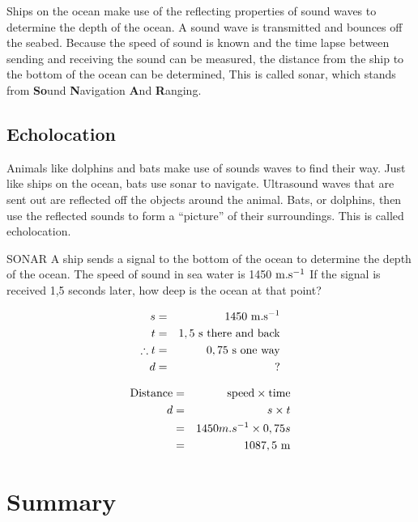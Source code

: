 Ships on the ocean make use of the reflecting properties of sound waves to determine the depth of the ocean. A sound wave is transmitted and bounces off the seabed. Because the speed of sound is known and the time lapse between sending and receiving the sound can be measured, the distance from the ship to the bottom of the ocean can be determined, This is called sonar, which stands from \textbf{So}und \textbf{N}avigation \textbf{A}nd \textbf{R}anging.

\subsection{Echolocation}
Animals like dolphins and bats make use of sounds waves to find their way. Just like ships on the ocean, bats use sonar to navigate. Ultrasound waves that are sent out are reflected off the objects around the animal. Bats, or dolphins, then use the reflected sounds to form a ``picture'' of their surroundings. This is called echolocation.

\begin{wex}{SONAR}
{A ship sends a signal to the bottom of the ocean to determine the depth of the ocean. The speed of sound in sea water is 1450 $\rm{m.s^{-1}}$ If the signal is received 1,5 seconds later, how deep is the ocean at that point?}
{
\begin{eqnarray*}
s &=& 1450 \ \rm{m.s^{-1}}\\
t &=& 1,5 \ \rm{s} \ \rm{there \ and \ back}\\
\therefore t &= & 0,75 \ \rm{s} \ \rm{one \ way}\\
d &=& ?
\end{eqnarray*}

\begin{eqnarray*}
\rm{Distance} &=& \rm{speed} \times \rm{time} \\
d &=& s \times t \\
&=& 1450 m.s^{-1} \times 0,75 s \\
&=& 1087,5 \ \rm{m}
\end{eqnarray*}

}
\end{wex}

\section{Summary}

